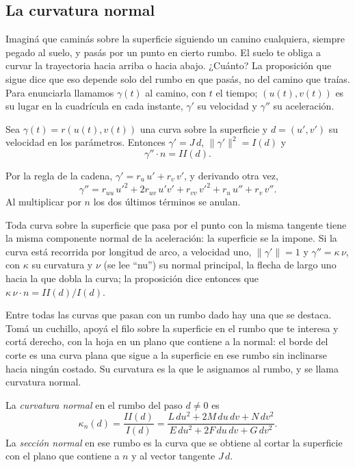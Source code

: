 \subsection{La curvatura normal}

Imaginá que caminás sobre la superficie siguiendo un camino cualquiera, siempre pegado al
suelo, y pasás por un punto en cierto rumbo. El suelo te obliga a curvar la trayectoria hacia
arriba o hacia abajo. ¿Cuánto? La proposición que sigue dice que eso depende solo del rumbo en
que pasás, no del camino que traías. Para enunciarla llamamos \(\gamma(t)\) al camino, con
\(t\) el tiempo; \((u(t),v(t))\) es su lugar en la cuadrícula en cada instante, \(\gamma'\) su
velocidad y \(\gamma''\) su aceleración.

\begin{proposicion}\label{prop:curva-sobre-superficie}
Sea \(\gamma(t)=r(u(t),v(t))\) una curva sobre la superficie y \(d=(u',v')\) su velocidad en
los parámetros. Entonces \(\gamma'=J\,d\), \(\lVert\gamma'\rVert^2=I(d)\) y
\[
  \gamma''\cdot n=II(d).
\]
\end{proposicion}

\begin{demostracion}
Por la regla de la cadena, \(\gamma'=r_u\,u'+r_v\,v'\), y derivando otra vez,
\[
  \gamma''=r_{uu}\,u'^2+2r_{uv}\,u'v'+r_{vv}\,v'^2+r_u\,u''+r_v\,v'' .
\]
Al multiplicar por \(n\) los dos últimos términos se anulan.
\end{demostracion}

Toda curva sobre la superficie que pasa por el punto con la misma tangente tiene la misma
componente normal de la aceleración: la superficie se la impone. Si la curva está recorrida
por longitud de arco, a velocidad uno, \(\lVert\gamma'\rVert=1\) y \(\gamma''=\kappa\,\nu\), con \(\kappa\) su
curvatura y \(\nu\) (se lee \enquote{nu}) su normal principal, la flecha de largo uno hacia la
que dobla la curva; la proposición dice entonces que
\(\kappa\,\nu\cdot n=II(d)/I(d)\).

Entre todas las curvas que pasan con un rumbo dado hay una que se destaca. Tomá un cuchillo,
apoyá el filo sobre la superficie en el rumbo que te interesa y cortá derecho, con la hoja en
un plano que contiene a la normal: el borde del corte es una curva plana que sigue a la
superficie en ese rumbo sin inclinarse hacia ningún costado. Su curvatura es la que le
asignamos al rumbo, y se llama curvatura normal.

\begin{definicion}\label{def:curvatura-normal}
La \emph{curvatura normal} en el rumbo del paso \(d\neq0\) es
\[
  \kappa_n(d)=\frac{II(d)}{I(d)}=\frac{L\,du^2+2M\,du\,dv+N\,dv^2}{E\,du^2+2F\,du\,dv+G\,dv^2}.
\]
La \emph{sección normal} en ese rumbo es la curva que se obtiene al cortar la superficie con
el plano que contiene a \(n\) y al vector tangente \(J\,d\).
\end{definicion}

